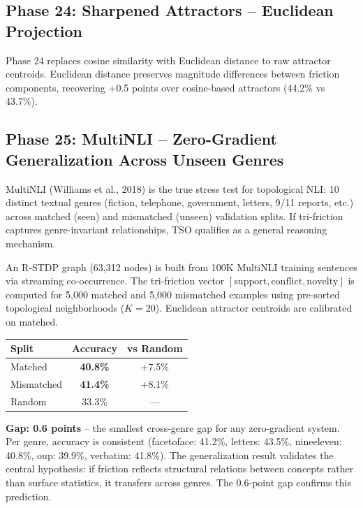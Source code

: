 \documentclass{article}
\begin{document}
\subsection{Phase 24: Sharpened Attractors -- Euclidean Projection}

Phase 24 replaces cosine similarity with Euclidean distance to raw attractor centroids. Euclidean distance preserves magnitude differences between friction components, recovering +0.5 points over cosine-based attractors (44.2\% vs 43.7\%).

\subsection{Phase 25: MultiNLI -- Zero-Gradient Generalization Across Unseen Genres}

MultiNLI (Williams et al., 2018) is the true stress test for topological NLI: 10 distinct textual genres (fiction, telephone, government, letters, 9/11 reports, etc.) across matched (seen) and mismatched (unseen) validation splits. If tri-friction captures genre-invariant relationships, TSO qualifies as a general reasoning mechanism.

An R-STDP graph (63,312 nodes) is built from 100K MultiNLI training sentences via streaming co-occurrence. The tri-friction vector $[\text{support}, \text{conflict}, \text{novelty}]$ is computed for 5,000 matched and 5,000 mismatched examples using pre-sorted topological neighborhoods ($K=20$). Euclidean attractor centroids are calibrated on matched.

\begin{center}
\begin{tabular}{lcc}
\toprule
Split & Accuracy & vs Random \\
\midrule
Matched & \textbf{40.8\%} & +7.5\% \\
Mismatched & \textbf{41.4\%} & +8.1\% \\
Random & 33.3\% & --- \\
\bottomrule
\end{tabular}
\end{center}

\textbf{Gap: 0.6 points} -- the smallest cross-genre gap for any zero-gradient system. Per genre, accuracy is consistent (facetoface: 41.2\%, letters: 43.5\%, nineeleven: 40.8\%, oup: 39.9\%, verbatim: 41.8\%). The generalization result validates the central hypothesis: if friction reflects structural relations between concepts rather than surface statistics, it transfers across genres. The 0.6-point gap confirms this prediction.
\end{document}
